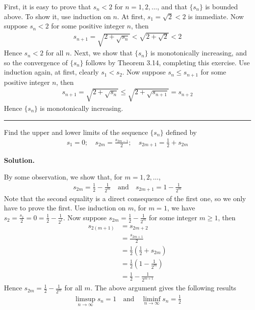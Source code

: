 \documentclass[12pt]{article}
\theoremstyle{definition}
\begin{document}
First, it is easy to prove that $s_n<2$ for $n=1,2,\ldots$, and that $\{s_n\}$ is bounded above. To show it, use induction on $n$. At first, $s_1=\sqrt{2}<2$ is immediate. Now suppose $s_n<2$ for some positive integer $n$, then
\begin{align*}
s_{n+1}=\sqrt{2+\sqrt{s_n}}<\sqrt{2+\sqrt{2}}<2
\end{align*}
Hence $s_n<2$ for all $n$. Next, we show that $\{s_n\}$ is monotonically increasing, and so the convergence of $\{s_n\}$ follows by Theorem 3.14, completing this exercise. Use induction again, at first, clearly $s_1<s_2$. Now suppose $s_n\le s_{n+1}$ for some positive integer $n$, then
\begin{align*}
s_{n+1}=\sqrt{2+\sqrt{s_n}}\le\sqrt{2+\sqrt{s_{n+1}}}=s_{n+2}
\end{align*}
Hence $\{s_n\}$ is monotonically increasing.



\bigskip\noindent\hrule\bigskip

Find the upper and lower limits of the sequence $\{s_n\}$ defined by
\begin{align*}
s_1=0;\quad s_{2m}=\frac{s_{2m-1}}{2};\quad s_{2m+1}=\frac{1}{2}+s_{2m}
\end{align*}

\smallskip
\noindent\textbf{Solution.}\quad

By some observation, we show that, for $m=1,2,\ldots$,
\begin{align*}
s_{2m}=\frac{1}{2}-\frac{1}{2^m} \quad\mbox{and}\quad 
s_{2m+1}=1-\frac{1}{2^m}
\end{align*}
Note that the second equality is a direct consequence of the first one, so we only have to prove the first. Use induction on $m$, for $m=1$, we have $s_2=\frac{s_1}{2}=0=\frac{1}{2}-\frac{1}{2^1}$. Now suppose $s_{2m}=\frac{1}{2}-\frac{1}{2^m}$ for some integer $m\ge 1$, then
\begin{align*}
s_{2(m+1)}
&=s_{2m+2} \\
&=\frac{s_{2m+1}}{2} \\
&=\frac{1}{2}\left(\frac{1}{2}+s_{2m}\right) \\
&=\frac{1}{2}\left(1-\frac{1}{2^m}\right) \\
&=\frac{1}{2}-\frac{1}{2^{m+1}}
\end{align*}
Hence $s_{2m}=\frac{1}{2}-\frac{1}{2^m}$ for all $m$. The above argument gives the following results
\begin{align*}
\limsup_{n\to\infty}s_n=1\quad\mbox{and}\quad\liminf_{n\to\infty}s_n=\frac{1}{2}
\end{align*}
\end{document}
